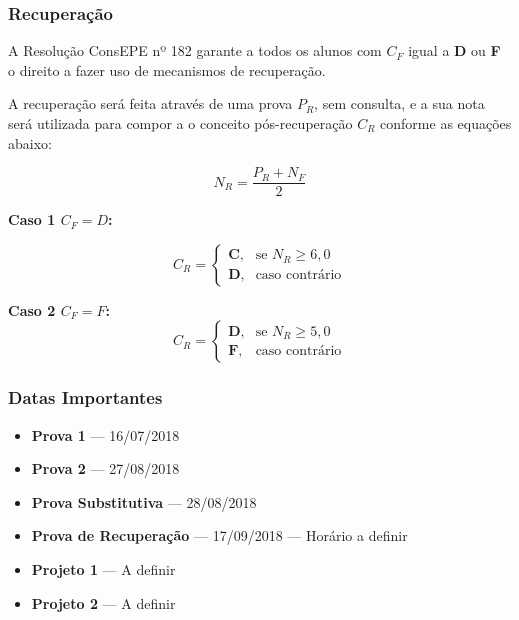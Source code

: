 \documentclass[Ligatures=TeX,table,brazil,svgnames,usetotalslideindicator,comp
ress,10pt]{beamer}
\begin{document}
\begin{frame}
  \frametitle{Recuperação} A Resolução ConsEPE nº 182 garante a todos
  os alunos com \(C_F\) igual a \textbf{D} ou \textbf{F} o direito a
  fazer uso de mecanismos de recuperação.

A recuperação será feita através de uma prova \(P_R\), sem consulta,
e a sua nota será utilizada para compor a o conceito
pós-recuperação \(C_R\) conforme as equações abaixo:

$$N_R = \frac{P_R + N_F}{2}$$

\textbf{Caso 1 \(C_F = D\):}

\begin{equation*}
C_R =
    \begin{cases}
    \textbf{C} ,& \text{se } N_R \geq 6,0 \\
    \textbf{D} ,& \text{caso contrário}
    \end{cases}
\end{equation*}

\textbf{Caso 2 \(C_F = F\):}
\begin{equation*}
C_R =
    \begin{cases}
    \textbf{D} ,& \text{se } N_R \geq 5,0 \\
    \textbf{F} ,& \text{caso contrário}
    \end{cases}
\end{equation*}
\end{frame}


\begin{frame}
  \frametitle{Datas Importantes}
  \begin{itemize}
  \item \textbf{Prova 1} --- 16/07/2018
  \item \textbf{Prova 2} --- 27/08/2018
  \item \textbf{Prova Substitutiva} --- 28/08/2018
  \item \textbf{Prova de Recuperação} --- 17/09/2018 --- Horário a definir
  \item \textbf{Projeto 1} --- A definir
  \item \textbf{Projeto 2} --- A definir
  \end{itemize}
\end{frame}
\end{document}
